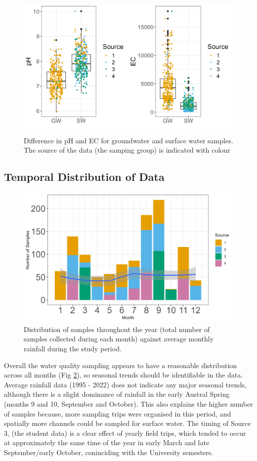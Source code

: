 \documentclass[, manuscript]{copernicus}
\begin{document}
\begin{figure}
\includegraphics[width=0.8\linewidth]{Figures/gwsw} \caption{Difference in pH and EC for groundwater and surface water samples. The source of the data (the samping group) is indicated with colour}\label{fig:gw_sw-plot}
\end{figure}

\subsection{Temporal Distribution of Data}

\clearpage

\begin{figure}
\includegraphics[width=0.5\linewidth]{Figures/monthly} \caption{Distribution of samples throughout the year (total number of samples collected during each month) against average monthly rainfall during the study period. }\label{fig:month-plot}
\end{figure}

Overall the water quality sampling appears to have a reasonable
distribution across all months (Fig \ref{fig:month-plot}), so seasonal
trends should be identifiable in the data. Average rainfall data (1995 -
2022) does not indicate any major seasonal trends, although there is a
slight dominance of rainfall in the early Austral Spring (months 9 and
10, September and October). This also explains the higher number of
samples because, more sampling trips were organised in this period, and
spatially more channels could be sampled for surface water. The timing
of Source 3, (the student data) is a clear effect of yearly field trips,
which tended to occur at approximately the same time of the year in
early March and late September/early October, coninciding with the
University semesters.
\end{document}
